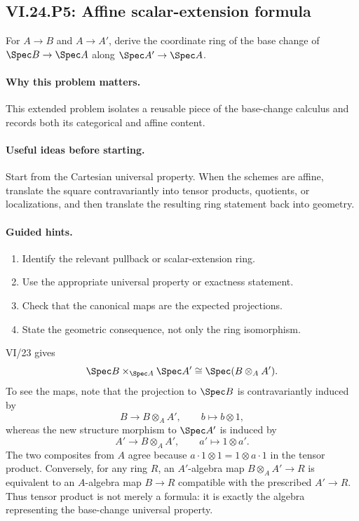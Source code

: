 \subsection*{VI.24.P5: Affine scalar-extension formula}
\begin{problem}\label{prob:vi24-p05}
For $A\to B$ and $A\to A'$, derive the coordinate ring of the base change of $\Spec B\to\Spec A$ along $\Spec A'\to\Spec A$.
\end{problem}

\ifdefined\FullProblemDossiers
\paragraph{Why this problem matters.}
This extended problem isolates a reusable piece of the base-change calculus and records both its categorical and affine content.

\paragraph{Useful ideas before starting.}
Start from the Cartesian universal property.  When the schemes are affine, translate the square contravariantly into tensor products, quotients, or localizations, and then translate the resulting ring statement back into geometry.

\paragraph{Guided hints.}
\begin{enumerate}
\item Identify the relevant pullback or scalar-extension ring.
\item Use the appropriate universal property or exactness statement.
\item Check that the canonical maps are the expected projections.
\item State the geometric consequence, not only the ring isomorphism.
\end{enumerate}

\begin{solution}
VI/23 gives
\[
\Spec B\times_{\Spec A}\Spec A'\cong\Spec(B\otimes_AA').
\]
To see the maps, note that the projection to $\Spec B$ is contravariantly induced by
\[
B\longrightarrow B\otimes_AA',\qquad b\longmapsto b\otimes1,
\]
whereas the new structure morphism to $\Spec A'$ is induced by
\[
A'\longrightarrow B\otimes_AA',\qquad a'\longmapsto1\otimes a'.
\]
The two composites from $A$ agree because $a\cdot1\otimes1=1\otimes a\cdot1$ in the tensor product.  Conversely, for any ring $R$, an $A'$-algebra map $B\otimes_AA'\to R$ is equivalent to an $A$-algebra map $B\to R$ compatible with the prescribed $A'\to R$.  Thus tensor product is not merely a formula: it is exactly the algebra representing the base-change universal property.
\end{solution}


